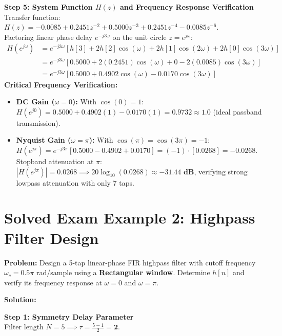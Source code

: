 \documentclass[11pt,a4paper]{article}
\begin{document}
\noindent\textbf{Step 5: System Function $H(z)$ and Frequency Response Verification} \\
Transfer function: $H(z) = -0.0085 + 0.2451 z^{-2} + 0.5000 z^{-3} + 0.2451 z^{-4} - 0.0085 z^{-6}$. \\
Factoring linear phase delay $e^{-j 3\omega}$ on the unit circle $z = e^{j\omega}$:
\begin{align}
H(e^{j\omega}) &= e^{-j 3\omega} \left[ h[3] + 2h[2]\cos(\omega) + 2h[1]\cos(2\omega) + 2h[0]\cos(3\omega) \right] \nonumber \\
&= e^{-j 3\omega} \left[ 0.5000 + 2(0.2451)\cos(\omega) + 0 - 2(0.0085)\cos(3\omega) \right] \nonumber \\
&= e^{-j 3\omega} \left[ 0.5000 + 0.4902\cos(\omega) - 0.0170\cos(3\omega) \right]
\end{align}
\noindent\textbf{Critical Frequency Verification:}
\begin{itemize}
    \item \textbf{DC Gain ($\omega = 0$):} With $\cos(0) = 1$:
    $H(e^{j0}) = 0.5000 + 0.4902(1) - 0.0170(1) = \mathbf{0.9732} \approx 1.0$ (ideal passband transmission).
    \item \textbf{Nyquist Gain ($\omega = \pi$):} With $\cos(\pi) = \cos(3\pi) = -1$:
    $H(e^{j\pi}) = e^{-j 3\pi} [0.5000 - 0.4902 + 0.0170] = (-1) \cdot [0.0268] = \mathbf{-0.0268}$. \\
    Stopband attenuation at $\pi$: $|H(e^{j\pi})| = 0.0268 \implies 20\log_{10}(0.0268) \approx \mathbf{-31.44\text{ dB}}$, verifying strong lowpass attenuation with only 7 taps.
\end{itemize}

\newpage

\section{Solved Exam Example 2: Highpass Filter Design}

\textbf{Problem:} Design a 5-tap linear-phase FIR highpass filter with cutoff frequency $\omega_c = 0.5\pi$ rad/sample using a \textbf{Rectangular window}. Determine $h[n]$ and verify its frequency response at $\omega = 0$ and $\omega = \pi$.

\vspace{1mm}
\noindent\textbf{Solution:}

\noindent\textbf{Step 1: Symmetry Delay Parameter} \\
Filter length $N = 5 \implies \tau = \frac{5 - 1}{2} = \mathbf{2}$.
\end{document}
